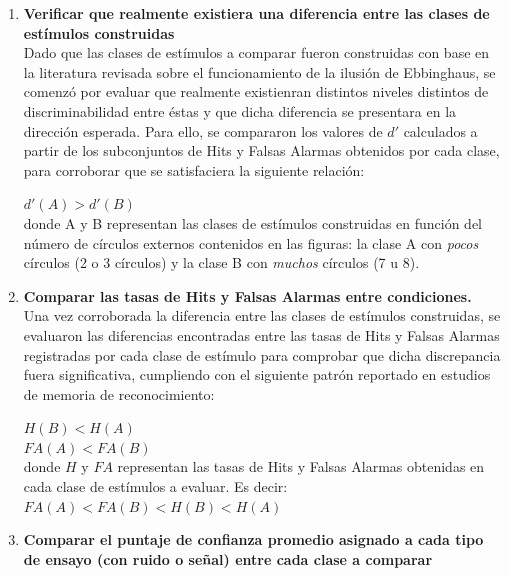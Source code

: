\begin{enumerate}
\item \textbf{Verificar que realmente existiera una diferencia entre las clases de estímulos construidas}\\

Dado que las clases de estímulos a comparar fueron construidas con base en la literatura revisada sobre el funcionamiento de la ilusión de Ebbinghaus, se comenzó por evaluar que realmente existienran distintos niveles distintos de discriminabilidad entre éstas y que dicha diferencia se presentara en la dirección esperada. Para ello, se compararon los valores de $d'$ calculados a partir de los subconjuntos de Hits y Falsas Alarmas obtenidos por cada clase, para corroborar que se satisfaciera la siguiente relación:\\

\begin{center}
 $d'(A) > d'(B)$\\
 donde A y B representan las clases de estímulos construidas en función del número de círculos externos contenidos en las figuras: la clase A con \textit{pocos} círculos (2 o 3 círculos) y la clase B con \textit{muchos} círculos (7 u 8).\\
\end{center}

\item \textbf{Comparar las tasas de Hits y Falsas Alarmas entre condiciones.}\\

Una vez corroborada la diferencia entre las clases de estímulos construidas, se evaluaron las diferencias encontradas entre las tasas de Hits y Falsas Alarmas registradas por cada clase de estímulo para comprobar que dicha discrepancia fuera significativa, cumpliendo con el siguiente patrón reportado en estudios de memoria de reconocimiento:\\

\begin{center}
$H(B) < H(A)$\\
$FA(A) < FA(B)$\\
donde $H$ y $FA$ representan las tasas de Hits y Falsas Alarmas obtenidas en cada clase de estímulos a evaluar. Es decir:\\
$FA(A) < FA(B) < H(B) < H(A)$\\
\end{center}

\item \textbf{Comparar el puntaje de confianza promedio asignado a cada tipo de ensayo (con ruido o señal) entre cada clase a comparar}\\


\end{enumerate}
